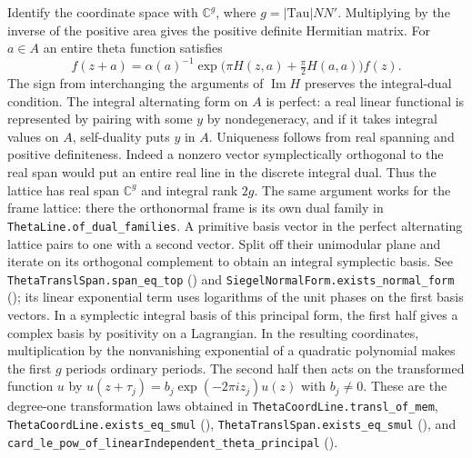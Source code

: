 Identify the coordinate space with $\mathbb C^g$, where
$g=|\mathrm{Tau}|NN'$. Multiplying by the inverse of the positive
area gives the positive definite Hermitian matrix. For $a\in A$ an entire
theta function satisfies
\[
 f(z+a)=\alpha(a)^{-1}\exp\big(\pi H(z,a)+\tfrac\pi2 H(a,a)\big) f(z).
\]
The sign from interchanging the arguments of $\operatorname{Im}H$ preserves
the integral-dual condition.
The integral alternating form on $A$ is perfect: a real linear functional
is represented by pairing with some $y$ by nondegeneracy, and if it takes
integral values on $A$, self-duality puts $y$ in $A$. Uniqueness follows
from real spanning and positive definiteness. Indeed a nonzero vector
symplectically orthogonal to the real span would put an entire real
line in the discrete integral dual. Thus the lattice has real span
$\mathbb C^g$ and integral rank $2g$. The same argument works for
the frame lattice: there the orthonormal frame is its own dual family
in \nolinkurl{ThetaLine.of_dual_families}.
A primitive basis vector in the perfect alternating lattice pairs to
one with a second vector. Split off their unimodular plane and iterate
on its orthogonal complement to obtain an integral symplectic basis.
See \nolinkurl{ThetaTranslSpan.span_eq_top}
() and
\nolinkurl{SiegelNormalForm.exists_normal_form}
(); its linear
exponential term uses logarithms of the unit phases on the first
basis vectors. In a symplectic integral
basis of this principal form, the first half gives a complex basis by
positivity on a Lagrangian. In the resulting coordinates, multiplication
by the nonvanishing exponential of a quadratic polynomial makes the
first $g$ periods ordinary periods. The second half then acts on the
transformed function $u$ by
$u(z+\tau_j)=b_j\exp(-2\pi i z_j)u(z)$ with $b_j\ne0$.
These are the degree-one transformation laws obtained in
\nolinkurl{ThetaCoordLine.transl_of_mem}, \nolinkurl{ThetaCoordLine.exists_eq_smul}
(),
\nolinkurl{ThetaTranslSpan.exists_eq_smul}
(), and
\nolinkurl{card_le_pow_of_linearIndependent_theta_principal}
().

